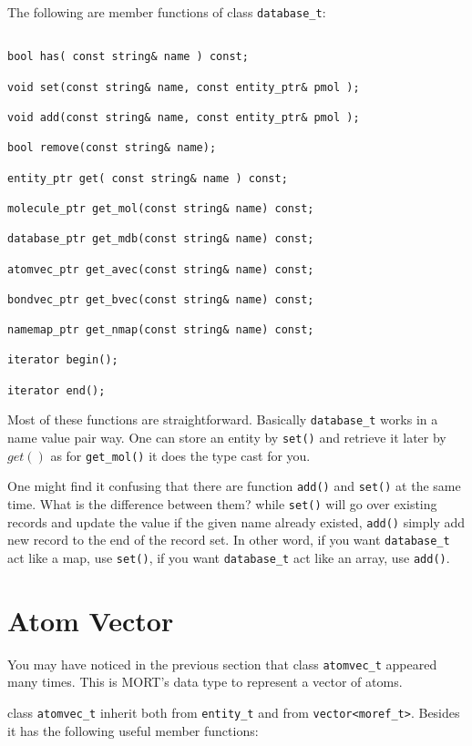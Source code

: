 \documentclass[letterpaper]{book}
\begin{document}
  The  following are member functions of class \lstinline$database_t$:

\begin{lstlisting}

bool has( const string& name ) const;

void set(const string& name, const entity_ptr& pmol );

void add(const string& name, const entity_ptr& pmol );

bool remove(const string& name);

entity_ptr get( const string& name ) const;

molecule_ptr get_mol(const string& name) const;

database_ptr get_mdb(const string& name) const;

atomvec_ptr get_avec(const string& name) const;

bondvec_ptr get_bvec(const string& name) const;

namemap_ptr get_nmap(const string& name) const;

iterator begin();

iterator end();

\end{lstlisting}

Most of these functions are straightforward. Basically \lstinline$database_t$ works in
a name value pair way. One can store an entity by \lstinline$set()$ and retrieve it later 
by $get()$ as for \lstinline$get_mol()$ it does the type cast for you.

One might find it confusing that there are function \lstinline$add()$ and \lstinline$set()$
at the same time. What is the difference between them? while \lstinline$set()$ will go
over existing records and update the value if the given name already existed, 
\lstinline$add()$ simply add new record to the end of the record set. In other word, if
you want \lstinline$database_t$ act like a map, use \lstinline$set()$,
if you want \lstinline$database_t$ act like an array, use \lstinline$add()$.


\section{Atom Vector}
  You may have noticed in the previous section that class \lstinline$atomvec_t$ appeared
many times. This is MORT's data type to represent a vector of atoms.

  class \lstinline$atomvec_t$ inherit both from \lstinline$entity_t$ and from \lstinline$vector<moref_t>$.
Besides it has the following  useful member functions:
\end{document}
